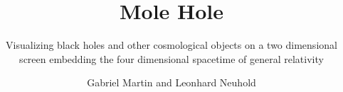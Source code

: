 \documentclass[graybox,envcountchap,sectrefs]{SNmono}
\begin{document}
\author{Gabriel Martin and Leonhard Neuhold}
\title{Mole Hole}
\subtitle{Visualizing black holes and other cosmological objects on a two 
dimensional screen embedding the four dimensional spacetime of general 
relativity}
\maketitle

\frontmatter%







\tableofcontents




\mainmatter%


















\backmatter%


\printglossary[type=\acronymtype, title=Acronyms]
\printindex

\end{document}
